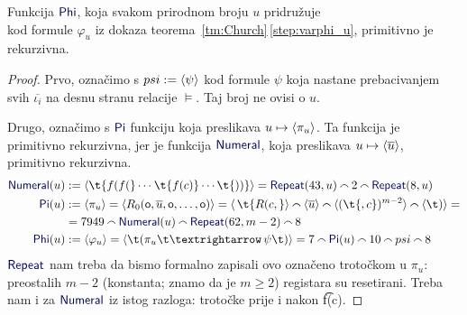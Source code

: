\begin{lema}[{name=[primitivna rekurzivnost svođenja $K$ na $\Valid$]}]\label{lm:K<Valid}
Funkcija $\f{Phi}$, koja svakom prirodnom broju $u$ pridružuje \\ kod formule $\varphi_u$ iz dokaza teorema~\ref{tm:Church}\,\eqref{step:varphi_u}, primitivno je rekurzivna.
\end{lema}
\begin{proof}
    Prvo, označimo s $psi:=\langle\psi\rangle$ kod formule $\psi$ koja nastane prebacivanjem svih $\overline{\iota_i}$ na desnu stranu relacije $\models$. Taj broj ne ovisi o $u$.

Drugo, označimo s $\f{Pi}$ funkciju koja preslikava $u\mapsto\langle\pi_u\rangle$. Ta funkcija je primitivno rekurzivna, jer je funkcija $\f{Numeral}$, koja preslikava $u\mapsto\langle\overline u\rangle$, primitivno rekurzivna.
\begin{align}
	\f{Numeral}(u)&:=\kr{\t{f(f(}\dotsb\mspace{1mu}\t{f(c)}\dotsm\t{))}}=\f{Repeat}(43,u)\conc{}2\conc{}\f{Repeat}(8,u)\\
    \f{Pi}(u)&:=\kr{\pi_u}=\kr{R_0(\mathsf o,\overline u,\mathsf o,\dotsc,\mathsf o)}=
    \kr{\,\t{R(c,}}\conc{}\kr{\overline u}\conc{}\kr{(\t{,c})^{m-2}}\conc{}\kr{\t)}=\notag\\
    &=7949\conc{}\f{Numeral}(u)\conc{}\f{Repeat}(62,m-2)\conc{}8\\
    \f{Phi}(u)&:=\kr{\varphi_u}=\kr{\t(\pi_u\!\,\t\textrightarrow\,\psi\t)}=7\conc{}\f{Pi}(u)\conc{}10\conc{}psi\conc{}8
\end{align}
    $\f{Repeat}$ nam treba da bismo formalno zapisali ovo označeno trotočkom u $\pi_u$: preostalih $m-2$ (konstanta; znamo da je $m\ge2$) registara su resetirani. Treba nam i za $\f{Numeral}$ iz istog razloga: trotočke prije i nakon \t{f(c)}.
\end{proof}


